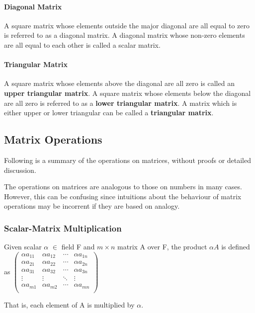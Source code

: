 \documentclass[12pt,letterpaper,final]{article}
\begin{document}
\paragraph{Diagonal Matrix} A square matrix whose elements outside the major diagonal are all equal to zero is referred to as a diagonal matrix. A diagonal matrix whose non-zero elements are all equal to each other is called a scalar matrix. 

\paragraph{Triangular Matrix} A square matrix whose elements above the diagonal are all zero is called an \textbf{upper triangular matrix}. A square matrix whose elements below the diagonal are all zero is referred to as a \textbf{lower triangular matrix}. A matrix which is either upper or lower triangular can be called a \textbf{triangular matrix}. 

\subsection{Matrix Operations}
Following is a summary of the operations on matrices, without proofs or detailed discussion. 

The operations on matrices are analogous to those on numbers in many cases. However, this can be confusing since intuitions about the behaviour of matrix operations may be incorrent if they are based on analogy. 

\subsubsection{Scalar-Matrix Multiplication}
Given scalar $\alpha$ $\in$ field F and $m \times n$ matrix A over F, the product $\alpha A$ is defined as 
$
 \begin{pmatrix}
\alpha a_{11} &\alpha  a_{12} &  \cdots & \alpha   a_{1n} \\
\alpha a_{21} &\alpha  a_{22} &  \cdots & \alpha  a_{2n}\\
\alpha a_{31} &\alpha  a_{32} &  \cdots & \alpha   a_{3n}\\
  \vdots  & \vdots  & \ddots & \vdots  \\
\alpha a_{m1} &\alpha  a_{m2} &  \cdots & \alpha  a_{mn}\\
 \end{pmatrix}
$

That is, each element of A is multiplied by $\alpha$. 
\end{document}
